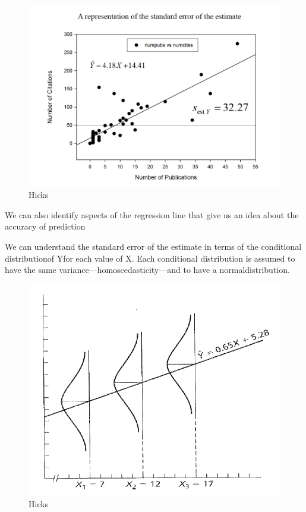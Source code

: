 \documentclass[]{book}
\theoremstyle{definition}
\theoremstyle{definition}
\theoremstyle{definition}
\theoremstyle{remark}
\begin{document}
{\begin{figure}
\centering
\includegraphics{img/hicksreg11.png}
\caption{Hicks}
\end{figure}

We can also identify aspects of the regression line that give us an idea
about the accuracy of prediction

We can understand the standard error of the estimate in terms of the
conditional distributionof Yfor each value of X. Each conditional
distribution is assumed to have the same
variance---homoscedasticity---and to have a normaldistribution.

\begin{figure}
\centering
\includegraphics{img/hicksreg12.png}
\caption{Hicks}
\end{figure}

}
\end{document}
